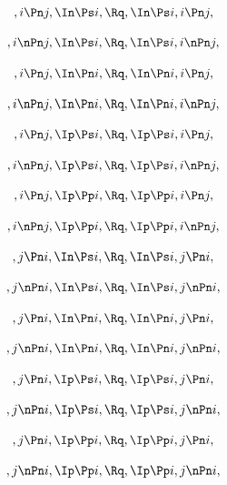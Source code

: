 \bigskip
\bigskip
\[,i \Pn j, \In \Ps i, \Rq , \In \Ps i, i \Pn j,\]

\[,i \nPn j, \In \Ps i, \Rq , \In \Ps i, i \nPn j,\]

\[,i \Pn j, \In \Pn i, \Rq , \In \Pn i, i \Pn j,\]

\[,i \nPn j, \In \Pn i, \Rq , \In \Pn i, i \nPn j,\]

\[,i \Pn j, \Ip \Ps i, \Rq , \Ip \Ps i, i \Pn j,\]

\[,i \nPn j, \Ip \Ps i, \Rq , \Ip \Ps i, i \nPn j,\]

\[,i \Pn j, \Ip \Pp i, \Rq , \Ip \Pp i, i \Pn j,\]

\[,i \nPn j, \Ip \Pp i, \Rq , \Ip \Pp i, i \nPn j,\]



\[,j \Pn i, \In \Ps i, \Rq , \In \Ps i, j \Pn i,\]

\[,j \nPn i, \In \Ps i, \Rq , \In \Ps i, j \nPn i,\]

\[,j \Pn i, \In \Pn i, \Rq , \In \Pn i, j \Pn i,\]

\[,j \nPn i, \In \Pn i, \Rq , \In \Pn i, j \nPn i,\]

\[,j \Pn i, \Ip \Ps i, \Rq , \Ip \Ps i, j \Pn i,\]

\[,j \nPn i, \Ip \Ps i, \Rq , \Ip \Ps i, j \nPn i,\]

\[,j \Pn i, \Ip \Pp i, \Rq , \Ip \Pp i, j \Pn i,\]

\[,j \nPn i, \Ip \Pp i, \Rq , \Ip \Pp i, j \nPn i,\]




\bigskip
\bigskip
